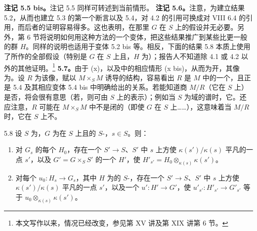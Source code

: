 \textbf{注记 5.5 bis。}注记 5.5 同样可转述到当前情形。
\textbf{注记 5.6。}注意，为建立结果 5.2，从而也建立 5.3 的第一个断言以及 5.4，对 4.2 的引用可换成对 VIII 6.4 的引用，而后者的证明容易得多。这也表明，在那里 $G$ 在 $S$ 上的假设并无必要。另外，第 6 节将说明如何用这种方法的一个变体，把这些结果推广到某些比更一般的群 $H$。同样的说明也适用于变体 5.2 bis 等。相反，下面的结果 5.8 本质上使用了所作的全部假设（特别是 $G$ 在 $S$ 上且，$H$ 为）；报告人不知道除 4.1 或 4.2 以外的其他证明。\begingroup\renewcommand{\thefootnote}{\ensuremath{*}}\footnote{本文写作以来，情况已经改变，参见第 XV 讲及第 XIX 讲第 6 节。}\endgroup{}
\textbf{5.7。}由于 (x)，以及中的相应情形 (x bis)，从而为开，其像为。设 $R$ 为该像，赋以 $M\times_S M$ 诱导的结构，容易看出 $R$ 是 $M$ 中的一个，且正是 5.4 及其相应变体 5.4 bis 中明确给出的关系。若能知道商 $M/R$（它在 $S$ 上）是否，将会很有意思（若，则可由 $S$ 上的表示）；例如当 $S$ 为域的谱时，它。还应注意，$R$ 可能在 $M\times_S M$ 中不是闭的（即使 $G$ 在 $S$ 上……），这意味着当 $M/R$ 时，它在 $S$ 上不。
\begin{SGAresult}{}{5.8}
设 $S$ 为，$G$ 为在 $S$ 上且的 $S$-，$s\in S$。则：
\begin{enumerate}
\item[a)] 对 $G_s$ 的每个 $H_0$，存在一个 $S'\to S$、$S'$ 中 $s$ 上方使 $\kappa(s')/\kappa(s)$ 平凡的一点 $s'$，以及 $G'=G\times_S S'$ 的一个 $H'$，使 $H'_{s'}=H_0\otimes_{\kappa(s)}\kappa(s')$。
\item[b)] 对每个 $u_0:H_s\to G_s$，其中 $H$ 为的 $S$-，存在一个 $S'\to S$、$S'$ 中 $s$ 上方使 $\kappa(s')/\kappa(s)$ 平凡的一点 $s'$，以及一个 $u':H'\to G'$，使 $u'_{s'}:H'_{s'}\to G'_{s'}$ 等于 $u_0\otimes_{\kappa(s)}\kappa(s')$。
\end{enumerate}
\end{SGAresult}
